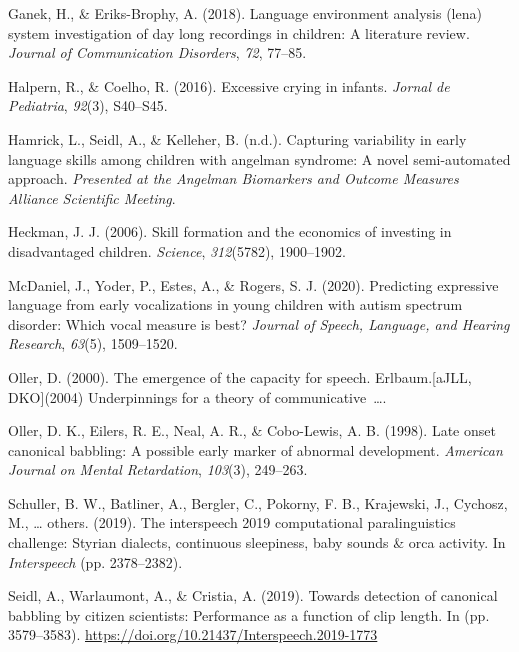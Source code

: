 \documentclass[english,,man,floatsintext]{apa6}
\begin{document}
\leavevmode\hypertarget{ref-ganek2018language}{}%
Ganek, H., \& Eriks-Brophy, A. (2018). Language environment analysis (lena) system investigation of day long recordings in children: A literature review. \emph{Journal of Communication Disorders}, \emph{72}, 77--85.

\leavevmode\hypertarget{ref-halpern2016excessive}{}%
Halpern, R., \& Coelho, R. (2016). Excessive crying in infants. \emph{Jornal de Pediatria}, \emph{92}(3), S40--S45.

\leavevmode\hypertarget{ref-hamrick2019capturing}{}%
Hamrick, L., Seidl, A., \& Kelleher, B. (n.d.). Capturing variability in early language skills among children with angelman syndrome: A novel semi-automated approach. \emph{Presented at the Angelman Biomarkers and Outcome Measures Alliance Scientific Meeting}.

\leavevmode\hypertarget{ref-heckman2006skill}{}%
Heckman, J. J. (2006). Skill formation and the economics of investing in disadvantaged children. \emph{Science}, \emph{312}(5782), 1900--1902.

\leavevmode\hypertarget{ref-mcdaniel2020predicting}{}%
McDaniel, J., Yoder, P., Estes, A., \& Rogers, S. J. (2020). Predicting expressive language from early vocalizations in young children with autism spectrum disorder: Which vocal measure is best? \emph{Journal of Speech, Language, and Hearing Research}, \emph{63}(5), 1509--1520.

\leavevmode\hypertarget{ref-oller2000emergence}{}%
Oller, D. (2000). The emergence of the capacity for speech. Erlbaum.{[}aJLL, DKO{]}(2004) Underpinnings for a theory of communicative~\ldots{}.

\leavevmode\hypertarget{ref-oller1998late}{}%
Oller, D. K., Eilers, R. E., Neal, A. R., \& Cobo-Lewis, A. B. (1998). Late onset canonical babbling: A possible early marker of abnormal development. \emph{American Journal on Mental Retardation}, \emph{103}(3), 249--263.

\leavevmode\hypertarget{ref-schuller2019interspeech}{}%
Schuller, B. W., Batliner, A., Bergler, C., Pokorny, F. B., Krajewski, J., Cychosz, M., \ldots{} others. (2019). The interspeech 2019 computational paralinguistics challenge: Styrian dialects, continuous sleepiness, baby sounds \& orca activity. In \emph{Interspeech} (pp. 2378--2382).

\leavevmode\hypertarget{ref-Seidl19}{}%
Seidl, A., Warlaumont, A., \& Cristia, A. (2019). Towards detection of canonical babbling by citizen scientists: Performance as a function of clip length. In (pp. 3579--3583). \url{https://doi.org/10.21437/Interspeech.2019-1773}
\end{document}
